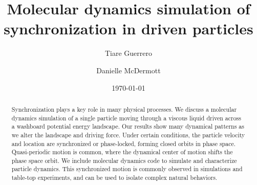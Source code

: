 \documentclass[twocolumn,preprintnumbers,amsmath,amssymb,aps,prx]{revtex4}
\begin{document}

\title{Molecular dynamics simulation of synchronization in driven particles}

\author{Tiare Guerrero}

\author{Danielle McDermott}

\date{\today}

\begin{abstract}
  Synchronization
  plays a key role in many physical processes.
  We discuss a %
  molecular dynamics simulation
  of a single particle
  moving through
  a viscous liquid
  driven 
  across a washboard potential energy landscape.
  Our results show many dynamical patterns
  as we alter the landscape and driving force.
  Under certain conditions,
  the particle velocity and location
  are synchronized or 
  phase-locked,
  forming closed orbits in phase space.
  Quasi-periodic motion is common, %
  where the
  dynamical center of motion shifts the
  phase space orbit.
  We include molecular dynamics code %
  to simulate and characterize
  particle dynamics.
  This synchronized motion %
  is
  commonly observed in 
  simulations and table-top experiments,
  and
  can be used to isolate
  complex natural behaviors.  
\end{abstract}
\end{document}
